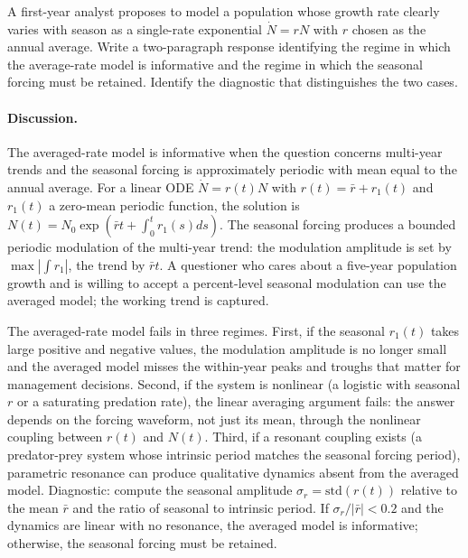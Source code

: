 \begin{exercise}
A first-year analyst proposes to model a population whose growth
rate clearly varies with season as a single-rate exponential
$\dot{N} = r N$ with $r$ chosen as the annual average. Write a
two-paragraph response identifying the regime in which the
average-rate model is informative and the regime in which the
seasonal forcing must be retained. Identify the diagnostic that
distinguishes the two cases.

\paragraph{Discussion.} The averaged-rate model is informative
when the question concerns multi-year trends and the seasonal
forcing is approximately periodic with mean equal to the
annual average. For a linear ODE $\dot{N} = r(t) N$ with
$r(t) = \bar{r} + r_{1}(t)$ and $r_{1}(t)$ a zero-mean
periodic function, the solution is $N(t) = N_{0} \exp(\bar{r} t
+ \int_{0}^{t} r_{1}(s) ds)$. The seasonal forcing produces a
bounded periodic modulation of the multi-year trend: the
modulation amplitude is set by $\max |\int r_{1}|$, the trend
by $\bar{r} t$. A questioner who cares about a five-year
population growth and is willing to accept a percent-level
seasonal modulation can use the averaged model; the working
trend is captured.

The averaged-rate model fails in three regimes. First, if the
seasonal $r_{1}(t)$ takes large positive and negative values,
the modulation amplitude is no longer small and the averaged
model misses the within-year peaks and troughs that matter for
management decisions. Second, if the system is nonlinear (a
logistic with seasonal $r$ or a saturating predation rate), the
linear averaging argument fails: the answer depends on the
forcing waveform, not just its mean, through the nonlinear
coupling between $r(t)$ and $N(t)$. Third, if a resonant
coupling exists (a predator-prey system whose intrinsic period
matches the seasonal forcing period), parametric resonance can
produce qualitative dynamics absent from the averaged model.
Diagnostic: compute the seasonal amplitude
$\sigma_{r} = \mathrm{std}(r(t))$ relative to the mean $\bar{r}$
and the ratio of seasonal to intrinsic period. If $\sigma_{r}/
|\bar{r}| < 0.2$ and the dynamics are linear with no resonance,
the averaged model is informative; otherwise, the seasonal
forcing must be retained.
\end{exercise}
